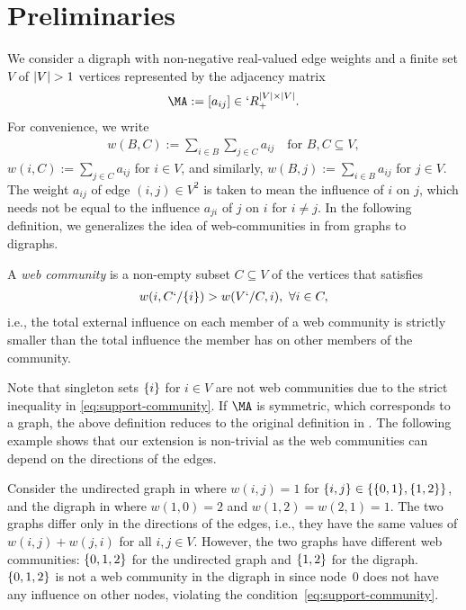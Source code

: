 \section{Preliminaries}
\label{sec:preliminaries}

We consider a digraph with non-negative real-valued edge weights and a finite set $V$ of $\lvert V\rvert>1$ vertices represented by the adjacency matrix
\begin{align*}
\MA := [a_{ij}]\in `R_+^{\abs{V}\times \abs{V}}.
\end{align*}
For convenience, we write
\begin{align*}
  w(B,C) := \sum_{i\in B}\sum_{j\in C} a_{ij} \quad \text{for }B,C\subseteq V,
\end{align*}
$w(i,C):=\sum_{j\in C}a_{ij}$ for $i\in V$, and similarly, $w(B,j):=\sum_{i\in B}a_{ij}$ for $j\in
V$. The weight $a_{ij}$ of edge $(i,j)\in V^2$ is taken to mean the influence of $i$ on $j$, which
needs not be equal to the influence $a_{ji}$ of $j$ on $i$ for $i\neq j$. In the following
definition, we generalizes the idea of web-communities in \cite{flake:efficient,
flake:cut-clustering} from graphs to digraphs.
\begin{definition}
  \label{def:support-community}
  A \emph{web community} is a non-empty subset $C\subseteq V$ of the vertices that satisfies
  \begin{align}
    \label{eq:support-community}
    w(i,C`/\{i\}) > w(V`/ C,i), \ \forall i \in C,
  \end{align}
  i.e., the total external influence on each member of a web community is strictly smaller than the
  total influence the member has on other members of the community. 
\end{definition}
Note that singleton sets $\{i\}$ for $i\in V$ are not web communities due to the strict inequality in \eqref{eq:support-community}. If $\MA$ is symmetric, which corresponds to a graph, the above definition reduces
to the original definition in \cite{flake:cut-clustering}. The following example shows that our extension is non-trivial as the web communities can depend on the directions of the edges.

\begin{example}
  \label{eg:directed-undirected}
  Consider the undirected graph in  where $w(i,j)=1$ for $\{i,j\}\in \{\{0,1\},\{1,2\}\}$, and the digraph in  where $w(1,0)=2$ and $w(1,2)=w(2,1)=1$. The two graphs differ only in the directions of the edges, i.e., they have the same values of $w(i,j)+w(j,i)$ for all $i,j\in V$. However, the two graphs have different web communities: $\{0,1,2\}$ for the undirected graph and $\{1,2\}$ for the digraph. $\{0,1,2\}$ is not a web community in the digraph in  since node~$0$ does not have any influence on other nodes, violating the condition~\eqref{eq:support-community}.
\end{example}


